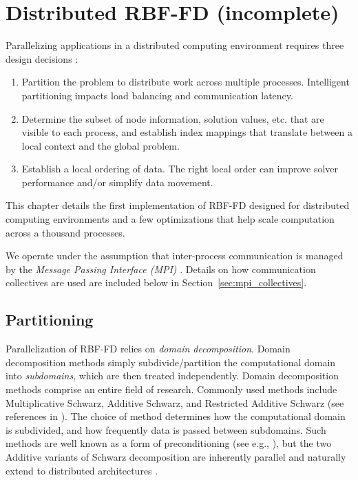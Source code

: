 \documentclass{report}
\begin{document}
\fi


\chapter{Distributed RBF-FD (incomplete)}
\label{chap:distributed_rbffd}



Parallelizing applications in a distributed computing environment requires three
design decisions \cite{Saad2003}: 
\begin{enumerate} 
\item Partition the problem to distribute work across multiple processes. Intelligent partitioning
impacts load balancing and communication latency.
\item Determine the subset of node information,
solution values, etc. that are visible to each process, and establish index mappings that translate between a local context and the global problem. 
\item Establish a local ordering of data. The right local order can improve solver performance and/or simplify data movement. %
\end{enumerate}

This chapter details the first implementation of RBF-FD designed for distributed computing environments and a few optimizations that help scale computation across a thousand processes. 

We operate under the assumption that inter-process communication is managed by the \emph{Message Passing Interface (MPI)} \cite{MPI}. Details on how communication collectives are used are included below in Section~\ref{sec:mpi_collectives}. 



\section{Partitioning}

Parallelization of RBF-FD relies on \emph{domain decomposition}. Domain decomposition methods simply subdivide/partition the computational domain into \emph{subdomains}, which are then treated independently. Domain decomposition methods comprise an entire field of research. Commonly used methods include Multiplicative Schwarz, Additive Schwarz, and Restricted Additive Schwarz (see references in \cite{Yokota2010,StCyr2007}). The choice of method determines how the computational domain is subdivided, and how frequently data is passed between subdomains. Such methods are well known as a form of preconditioning (see e.g., \cite{Beatson2000, StCyr2007}), but the two Additive variants of Schwarz decomposition are inherently parallel and naturally extend to distributed architectures \cite{Yokota2010, Gropp1990}. 
\end{document}
